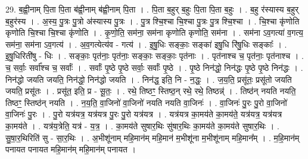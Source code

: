 \documentclass[17pt]{extarticle}
\begin{document}
29. ब॒ह्वी॒नाम् पि॒ता पि॒ता ब॑ह्वी॒नाम् ब॑ह्वी॒नाम् पि॒ता । . पि॒ता ब॒हुर् ब॒हुः पि॒ता पि॒ता ब॒हुः । . ब॒हु र॑स्यास्य ब॒हुर् ब॒हुर॑स्य । . अ॒स्य॒ पु॒त्रः पु॒त्रो अ॑स्यास्य पु॒त्रः । . पु॒त्र श्चि॒श्चा चि॒श्चा पु॒त्रः पु॒त्र श्चि॒श्चा । . चि॒श्चा कृ॑णोति कृणोति चि॒श्चा चि॒श्चा कृ॑णोति । . कृ॒णो॒ति॒ सम॑ना॒ सम॑ना कृणोति कृणोति॒ सम॑ना । . सम॑ना ऽव॒गत्या॑ व॒गत्य॒ सम॑ना॒ सम॑ना ऽव॒गत्य॑ । . अ॒व॒गत्येत्य॑व - गत्य॑ । . इ॒षु॒धिः सङ्काः॒ सङ्का॑ इषु॒धि रि॑षु॒धिः सङ्काः᳚ । . इ॒षु॒धिरिती॑षु - धिः । . सङ्काः॒ पृत॑नाः॒ पृत॑नाः॒ सङ्काः॒ सङ्काः॒ पृत॑नाः । . पृत॑नाश्च च॒ पृत॑नाः॒ पृत॑नाश्च । . च॒ सर्वाः॒ सर्वा᳚श्च च॒ सर्वाः᳚ । . सर्वाः᳚ पृ॒ष्ठे पृ॒ष्ठे सर्वाः॒ सर्वाः᳚ पृ॒ष्ठे । . पृ॒ष्ठे निन॑द्धो॒ निन॑द्धः पृ॒ष्ठे पृ॒ष्ठे निन॑द्धः । . निन॑द्धो जयति जयति॒ निन॑द्धो॒ निन॑द्धो जयति । . निन॑द्ध॒ इति॒ नि - न॒द्धः॒ । . ज॒य॒ति॒ प्रसू॑तः॒ प्रसू॑तो जयति जयति॒ प्रसू॑तः । . प्रसू॑त॒ इति॒ प्र - सू॒तः॒ । . रथे॒ तिष्ठꣳ॒॒ स्तिष्ठ॒न् रथे॒ रथे॒ तिष्ठन्न्॑ । . तिष्ठ॑न् नयति नयति॒ तिष्ठꣳ॒॒ स्तिष्ठ॑न् नयति । . न॒य॒ति॒ वा॒जिनो॑ वा॒जिनो॑ नयति नयति वा॒जिनः॑ । . वा॒जिनः॑ पु॒रः पु॒रो वा॒जिनो॑ वा॒जिनः॑ पु॒रः । . पु॒रो यत्र॑यत्र॒ यत्र॑यत्र पु॒रः पु॒रो यत्र॑यत्र । . यत्र॑यत्र का॒मय॑ते का॒मय॑ते॒ यत्र॑यत्र॒ यत्र॑यत्र का॒मय॑ते । . यत्र॑य॒त्रेति॒ यत्र॑ - य॒त्र॒ । . का॒मय॑ते सुषार॒थिः सु॑षार॒थिः का॒मय॑ते का॒मय॑ते सुषार॒थिः । . सु॒षा॒र॒थिरिति॑ सु - सा॒र॒थिः । . अ॒भीशू॑नाम् महि॒मान॑म् महि॒मान॑ म॒भीशू॑ना म॒भीशू॑नाम् महि॒मान᳚म् । . म॒हि॒मान॑म् पनायत पनायत महि॒मान॑म् महि॒मान॑म् पनायत । \newline
\end{document}
